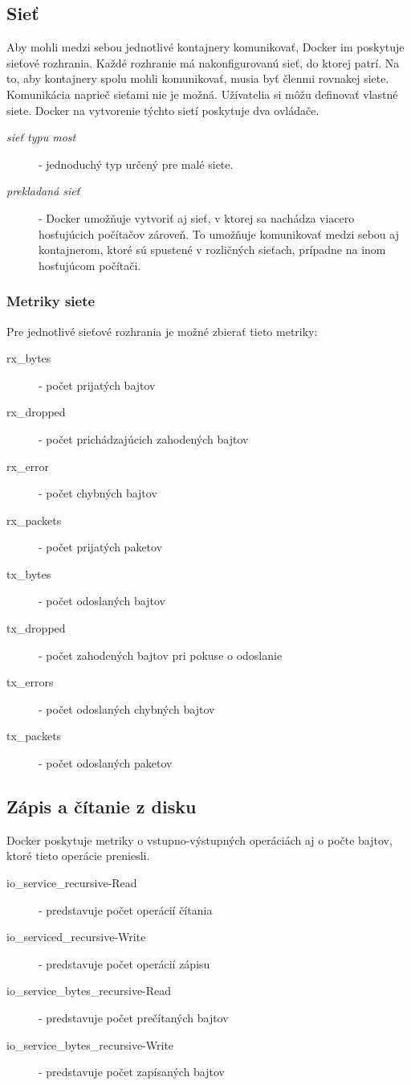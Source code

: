 \documentclass[printed,11pt,twoside,color,cover,table]{fithesis3}
\begin{document}
\subsection{Sieť}
Aby mohli medzi sebou jednotlivé kontajnery komunikovať, Docker im poskytuje sieťové rozhrania. Každé rozhranie má nakonfigurovanú sieť,
do ktorej patrí. Na to, aby kontajnery spolu mohli komunikovať, musia byť členmi rovnakej siete. Komunikácia naprieč sieťami nie je možná.
Užívatelia si môžu definovať vlastné siete. Docker na vytvorenie týchto sietí poskytuje dva ovládače.

\begin{description}
\item[\emph{sieť typu most}] - jednoduchý typ určený pre malé siete.
\item[\emph{prekladaná sieť}] - Docker umožňuje vytvoriť aj sieť, v ktorej sa nachádza viacero hosťujúcich počítačov zároveň. To umožňuje 
komunikovať medzi sebou aj kontajnerom, ktoré sú spustené v rozličných sieťach, prípadne na inom hosťujúcom počítači.
\end{description}

\subsubsection{Metriky siete}
Pre jednotlivé sieťové rozhrania je možné zbierať tieto metriky:
\begin{description}
\item[rx\_bytes] - počet prijatých bajtov
\item[rx\_dropped] - počet prichádzajúcich zahodených bajtov
\item[rx\_error] - počet chybných bajtov
\item[rx\_packets] - počet prijatých paketov
\item[tx\_bytes] - počet odoslaných bajtov
\item[tx\_dropped] - počet zahodených bajtov pri pokuse o odoslanie
\item[tx\_errors] - počet odoslaných chybných bajtov
\item[tx\_packets] - počet odoslaných paketov
\end{description}

\subsection{Zápis a čítanie z disku}
Docker poskytuje metriky o vstupno-výstupných operáciách aj o počte bajtov, ktoré tieto operácie preniesli.
\begin{description}
\item[io\_service\_recursive-Read] - predstavuje počet operácií čítania
\item[io\_serviced\_recursive-Write] - predstavuje počet operácií zápisu
\item[io\_service\_bytes\_recursive-Read] - predstavuje počet prečítaných bajtov
\item[io\_service\_bytes\_recursive-Write] - predstavuje počet zapísaných bajtov
\end{description}
\end{document}

